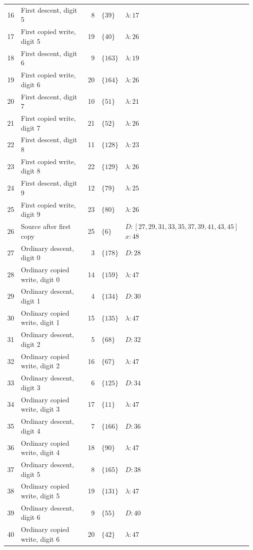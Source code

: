 \documentclass[11pt,a4paper]{article}
\newcommand{\blank}{\lambda}
\begin{document}
\begin{longtable}{r p{4.0cm} r l p{8.1cm}}
16 & First descent, digit 5 & 8 & $\{39\}$ & $\blank:17$ \\
17 & First copied write, digit 5 & 19 & $\{40\}$ & $\blank:26$ \\
18 & First descent, digit 6 & 9 & $\{163\}$ & $\blank:19$ \\
19 & First copied write, digit 6 & 20 & $\{164\}$ & $\blank:26$ \\
20 & First descent, digit 7 & 10 & $\{51\}$ & $\blank:21$ \\
21 & First copied write, digit 7 & 21 & $\{52\}$ & $\blank:26$ \\
22 & First descent, digit 8 & 11 & $\{128\}$ & $\blank:23$ \\
23 & First copied write, digit 8 & 22 & $\{129\}$ & $\blank:26$ \\
24 & First descent, digit 9 & 12 & $\{79\}$ & $\blank:25$ \\
25 & First copied write, digit 9 & 23 & $\{80\}$ & $\blank:26$ \\
26 & Source after first copy & 25 & $\{6\}$ & $D:[27,29,31,33,35,37,39,41,43,45]$\newline$x:48$ \\
27 & Ordinary descent, digit 0 & 3 & $\{178\}$ & $D:28$ \\
28 & Ordinary copied write, digit 0 & 14 & $\{159\}$ & $\blank:47$ \\
29 & Ordinary descent, digit 1 & 4 & $\{134\}$ & $D:30$ \\
30 & Ordinary copied write, digit 1 & 15 & $\{135\}$ & $\blank:47$ \\
31 & Ordinary descent, digit 2 & 5 & $\{68\}$ & $D:32$ \\
32 & Ordinary copied write, digit 2 & 16 & $\{67\}$ & $\blank:47$ \\
33 & Ordinary descent, digit 3 & 6 & $\{125\}$ & $D:34$ \\
34 & Ordinary copied write, digit 3 & 17 & $\{11\}$ & $\blank:47$ \\
35 & Ordinary descent, digit 4 & 7 & $\{166\}$ & $D:36$ \\
36 & Ordinary copied write, digit 4 & 18 & $\{90\}$ & $\blank:47$ \\
37 & Ordinary descent, digit 5 & 8 & $\{165\}$ & $D:38$ \\
38 & Ordinary copied write, digit 5 & 19 & $\{131\}$ & $\blank:47$ \\
39 & Ordinary descent, digit 6 & 9 & $\{55\}$ & $D:40$ \\
40 & Ordinary copied write, digit 6 & 20 & $\{42\}$ & $\blank:47$ \\

\end{longtable}
\end{document}
